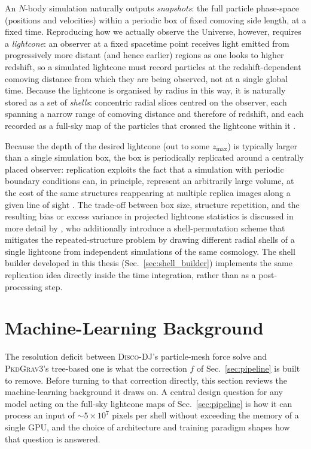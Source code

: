 \documentclass{report}
\begin{document}
An $N$-body simulation naturally outputs \emph{snapshots}: the full particle phase-space (positions and velocities) within a periodic box of fixed comoving side length, at a fixed time. Reproducing how we actually observe the Universe, however, requires a \emph{lightcone}: an observer at a fixed spacetime point receives light emitted from progressively more distant (and hence earlier) regions as one looks to higher redshift, so a simulated lightcone must record particles at the redshift-dependent comoving distance from which they are being observed, not at a single global time. Because the lightcone is organised by radius in this way, it is naturally stored as a set of \emph{shells}: concentric radial slices centred on the observer, each spanning a narrow range of comoving distance and therefore of redshift, and each recorded as a full-sky map of the particles that crossed the lightcone within it \cite{kacprzak_cosmogridv1_2023}.

Because the depth of the desired lightcone (out to some $z_{\max}$) is typically larger than a single simulation box, the box is periodically replicated around a centrally placed observer: replication exploits the fact that a simulation with periodic boundary conditions can, in principle, represent an arbitrarily large volume, at the cost of the same structures reappearing at multiple replica images along a given line of sight \cite{kacprzak_cosmogridv1_2023}. The trade-off between box size, structure repetition, and the resulting bias or excess variance in projected lightcone statistics is discussed in more detail by \citeauthor{kacprzak_cosmogridv1_2023} \cite{kacprzak_cosmogridv1_2023}, who additionally introduce a shell-permutation scheme that mitigates the repeated-structure problem by drawing different radial shells of a single lightcone from independent simulations of the same cosmology. The shell builder developed in this thesis (Sec.~\ref{sec:shell_builder}) implements the same replication idea directly inside the time integration, rather than as a post-processing step.

\clearpage
\section{Machine-Learning Background}
\label{sec:sr-methods}

The resolution deficit between \textsc{Disco-DJ}'s particle-mesh force solve and \textsc{PkdGrav3}'s tree-based one is what the correction $f$ of Sec.~\ref{sec:pipeline} is built to remove. Before turning to that correction directly, this section reviews the machine-learning background it draws on. A central design question for any model acting on the full-sky lightcone maps of Sec.~\ref{sec:pipeline} is how it can process an input of \mbox{$\sim 5\times10^7$} pixels per shell without exceeding the memory of a single GPU, and the choice of architecture and training paradigm shapes how that question is answered.
\end{document}
